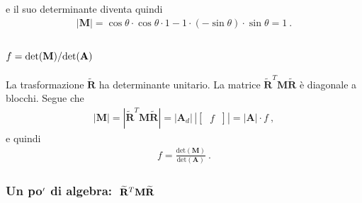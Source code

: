 \documentclass[letterpaper,10pt,italian]{jupyterBook}
\begin{document}
\sphinxAtStartPar
e il suo determinante diventa quindi
\begin{equation*}
\begin{split}|\mathbf{M}| = \cos \theta \cdot \cos \theta \cdot 1 - 1 \cdot ( - \sin \theta ) \cdot \sin \theta = 1 \ .\end{split}
\end{equation*}\subsubsection*{\protect\(f = \text{det}(\mathbf{M}) / \text{det}(\mathbf{A})\protect\)}

\sphinxAtStartPar
La trasformazione \(\widetilde{\mathbf{R}}\) ha determinante unitario. La matrice \(\widetilde{\mathbf{R}}^T \mathbf{M} \widetilde{\mathbf{R}}\) è diagonale a blocchi. Segue che
\begin{equation*}
\begin{split}|\mathbf{M}| = |\widetilde{\mathbf{R}}^T \mathbf{M} \widetilde{\mathbf{R}}| = | \mathbf{A}_d | \, | \begin{bmatrix} \ f \ \end{bmatrix} | = | \mathbf{A}| \cdot f \ ,\end{split}
\end{equation*}
\sphinxAtStartPar
e quindi
\begin{equation*}
\begin{split}f = \frac{\text{det}(\mathbf{M})}{\text{det}(\mathbf{A})} \ .\end{split}
\end{equation*}\subsubsection*{Un po\protect\('\protect\) di algebra: \protect\(\ \widetilde{\mathbf{R}}^T \mathbf{M} \widetilde{\mathbf{R}}\protect\)}
\end{document}

